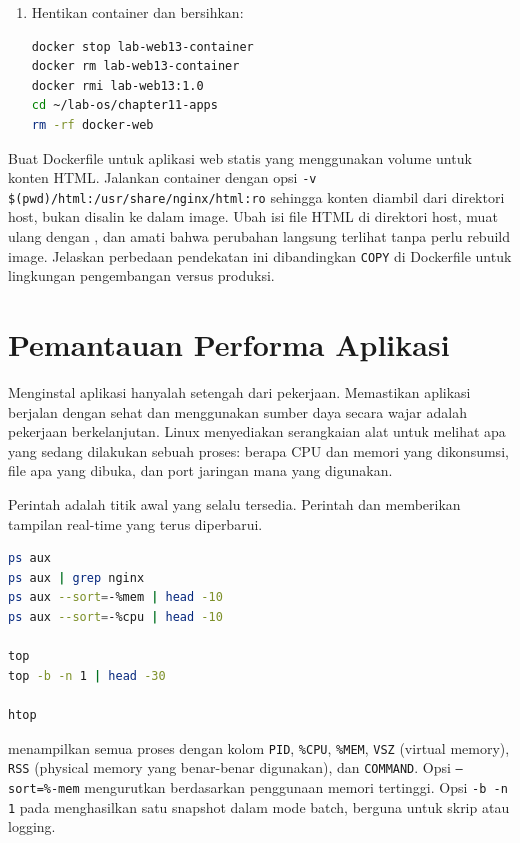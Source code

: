 \begin{enumerate}
    \item Hentikan container dan bersihkan:
\begin{lstlisting}[language=bash, caption={Bersihkan container dan image}]
docker stop lab-web13-container
docker rm lab-web13-container
docker rmi lab-web13:1.0
cd ~/lab-os/chapter11-apps
rm -rf docker-web
\end{lstlisting}
\end{enumerate}

\begin{challengebox}
Buat Dockerfile untuk aplikasi web statis yang menggunakan volume untuk
konten HTML. Jalankan container dengan opsi \texttt{-v \$(pwd)/html:/usr/share/nginx/html:ro}
sehingga konten diambil dari direktori host, bukan disalin ke dalam image.
Ubah isi file HTML di direktori host, muat ulang dengan , dan amati
bahwa perubahan langsung terlihat tanpa perlu rebuild image. Jelaskan perbedaan
pendekatan ini dibandingkan \texttt{COPY} di Dockerfile untuk lingkungan
pengembangan versus produksi.
\end{challengebox}

\section{Pemantauan Performa Aplikasi}
\label{sec:app-monitoring}

Menginstal aplikasi hanyalah setengah dari pekerjaan. Memastikan aplikasi berjalan
dengan sehat dan menggunakan sumber daya secara wajar adalah pekerjaan berkelanjutan.
Linux menyediakan serangkaian alat untuk melihat apa yang sedang dilakukan sebuah
proses: berapa CPU dan memori yang dikonsumsi, file apa yang dibuka, dan port
jaringan mana yang digunakan.

Perintah  adalah titik awal yang selalu tersedia. Perintah 
dan  memberikan tampilan real-time yang terus diperbarui.

\begin{lstlisting}[language=bash, caption={Memantau proses dengan ps dan top}]
ps aux
ps aux | grep nginx
ps aux --sort=-%mem | head -10
ps aux --sort=-%cpu | head -10

top
top -b -n 1 | head -30

htop
\end{lstlisting}

 menampilkan semua proses dengan kolom \texttt{PID}, \texttt{\%CPU},
\texttt{\%MEM}, \texttt{VSZ} (virtual memory), \texttt{RSS} (physical memory
yang benar-benar digunakan), dan \texttt{COMMAND}. Opsi \texttt{--sort=\%-mem}
mengurutkan berdasarkan penggunaan memori tertinggi. Opsi \texttt{-b -n 1} pada
 menghasilkan satu snapshot dalam mode batch, berguna untuk skrip atau
logging.

